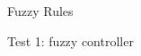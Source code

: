         \begin{figure}[H]
            \centering
            \caption{Fuzzy Rules}
            \label{fig:fuzzy_rules}
        \end{figure}

        \begin{multicols}{2}

            \begin{figure}[H]
                \centering
                \caption{Test 1: fuzzy controller}
                \label{fig:fuzzy_test1}
            \end{figure}


\end{multicols}

